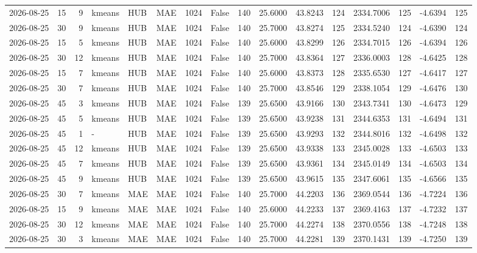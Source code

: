 \documentclass[10pt]{article}
\begin{document}
\begin{landscape}
\begin{longtable}{@{}lrrlllrcrrrrrrrr@{}}
2026-08-25 & 15 & 9 & kmeans & HUB & MAE & 1024 & False & 140 & 25.6000 & 43.8243 & 124 & 2334.7006 & 125 & -4.6394 & 125 \\
2026-08-25 & 30 & 9 & kmeans & HUB & MAE & 1024 & False & 140 & 25.7000 & 43.8274 & 125 & 2334.5240 & 124 & -4.6390 & 124 \\
2026-08-25 & 15 & 5 & kmeans & HUB & MAE & 1024 & False & 140 & 25.6000 & 43.8299 & 126 & 2334.7015 & 126 & -4.6394 & 126 \\
2026-08-25 & 30 & 12 & kmeans & HUB & MAE & 1024 & False & 140 & 25.7000 & 43.8364 & 127 & 2336.0003 & 128 & -4.6425 & 128 \\
2026-08-25 & 15 & 7 & kmeans & HUB & MAE & 1024 & False & 140 & 25.6000 & 43.8373 & 128 & 2335.6530 & 127 & -4.6417 & 127 \\
2026-08-25 & 30 & 7 & kmeans & HUB & MAE & 1024 & False & 140 & 25.7000 & 43.8546 & 129 & 2338.1054 & 129 & -4.6476 & 130 \\
2026-08-25 & 45 & 3 & kmeans & HUB & MAE & 1024 & False & 139 & 25.6500 & 43.9166 & 130 & 2343.7341 & 130 & -4.6473 & 129 \\
2026-08-25 & 45 & 5 & kmeans & HUB & MAE & 1024 & False & 139 & 25.6500 & 43.9238 & 131 & 2344.6353 & 131 & -4.6494 & 131 \\
2026-08-25 & 45 & 1 & - & HUB & MAE & 1024 & False & 139 & 25.6500 & 43.9293 & 132 & 2344.8016 & 132 & -4.6498 & 132 \\
2026-08-25 & 45 & 12 & kmeans & HUB & MAE & 1024 & False & 139 & 25.6500 & 43.9338 & 133 & 2345.0028 & 133 & -4.6503 & 133 \\
2026-08-25 & 45 & 7 & kmeans & HUB & MAE & 1024 & False & 139 & 25.6500 & 43.9361 & 134 & 2345.0149 & 134 & -4.6503 & 134 \\
2026-08-25 & 45 & 9 & kmeans & HUB & MAE & 1024 & False & 139 & 25.6500 & 43.9615 & 135 & 2347.6061 & 135 & -4.6566 & 135 \\
2026-08-25 & 30 & 7 & kmeans & MAE & MAE & 1024 & False & 140 & 25.7000 & 44.2203 & 136 & 2369.0544 & 136 & -4.7224 & 136 \\
2026-08-25 & 15 & 9 & kmeans & MAE & MAE & 1024 & False & 140 & 25.6000 & 44.2233 & 137 & 2369.4163 & 137 & -4.7232 & 137 \\
2026-08-25 & 30 & 12 & kmeans & MAE & MAE & 1024 & False & 140 & 25.7000 & 44.2274 & 138 & 2370.0556 & 138 & -4.7248 & 138 \\
2026-08-25 & 30 & 3 & kmeans & MAE & MAE & 1024 & False & 140 & 25.7000 & 44.2281 & 139 & 2370.1431 & 139 & -4.7250 & 139 \\

\end{longtable}
\end{landscape}
\end{document}
